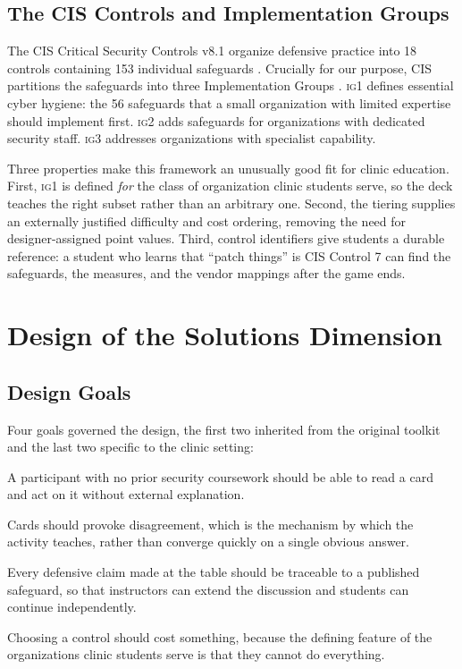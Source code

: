 \documentclass[10pt,twocolumn,letterpaper]{article}
\newcommand{\ig}[1]{\textsc{ig#1}}
\begin{document}
\subsection{The CIS Controls and Implementation Groups}

The CIS Critical Security Controls v8.1 organize defensive practice into 18
controls containing 153 individual safeguards \cite{cis2024controls}. Crucially
for our purpose, CIS partitions the safeguards into three Implementation Groups
\cite{cis_ig}. \ig{1} defines essential cyber hygiene: the 56 safeguards that a
small organization with limited expertise should implement first. \ig{2} adds
safeguards for organizations with dedicated security staff. \ig{3} addresses
organizations with specialist capability.

Three properties make this framework an unusually good fit for clinic
education. First, \ig{1} is defined \emph{for} the class of organization clinic
students serve, so the deck teaches the right subset rather than an arbitrary
one. Second, the tiering supplies an externally justified difficulty and cost
ordering, removing the need for designer-assigned point values. Third, control
identifiers give students a durable reference: a student who learns that
``patch things'' is CIS Control 7 can find the safeguards, the measures, and
the vendor mappings after the game ends.

\section{Design of the Solutions Dimension}
\label{sec:design}

\subsection{Design Goals}

Four goals governed the design, the first two inherited from the original
toolkit and the last two specific to the clinic setting:

\begin{description}[leftmargin=1em,style=nextline]
\item[G1. Vocabulary accessibility.] A participant with no prior security
coursework should be able to read a card and act on it without external
explanation.
\item[G2. Discussion generation.] Cards should provoke disagreement, which is
the mechanism by which the activity teaches, rather than converge quickly on a
single obvious answer.
\item[G3. Framework traceability.] Every defensive claim made at the table
should be traceable to a published safeguard, so that instructors can extend
the discussion and students can continue independently.
\item[G4. Constraint realism.] Choosing a control should cost something, because
the defining feature of the organizations clinic students serve is that they
cannot do everything.
\end{description}
\end{document}
